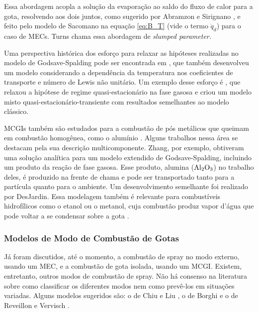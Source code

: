 Essa abordagem acopla a solução da evaporação ao saldo do fluxo de calor para a gota, resolvendo aos dois juntos, como sugerido por Abramzon e Sirignano \cite{Sirignano1989}, e feito pelo modelo de Sacomano\etal \cite{SacomanoF2022IJHMT} na equação \eqref{eq:B_T} (vide o termo $\dot q_d$) para o caso de MECs.
Turns \cite{Turns2000} chama essa abordagem de \emph{slumped parameter.}

Uma perspectiva histórica dos esforço para relaxar as hipóteses realizadas no modelo de Godsave-Spalding pode ser encontrada em \cite{FachiniF1999}, que também desenvolveu um modelo considerando a dependência da temperatura nos coeficientes de transporte e número de Lewis não unitário.
Um exemplo desse esforço é \cite{UlzamaS2007}, que relaxou a hipótese de regime quasi-estacionário na fase gasosa e criou um modelo misto quasi-estacionário-transiente com resultados semelhantes ao modelo clássico.

MCGIs também são estudados para a combustão de pós metálicos que queimam em combustão homogênea, como o alumínio \cite[p. 7]{Bergthorson2015}.
Alguns trabalhos nessa área se destacam pela sua descrição multicomponente. 
Zhang\etal \cite{Zhang2022_Coflow,Zhang2022_Counterflow}, por exemplo, obtiveram uma solução analítica para um modelo extendido de Godsave-Spalding, incluindo um produto da reação de fase gasosa.
Esse produto, alumina ($\mathrm{Al}_2 \mathrm{O}_3$) no trabalho deles, é produzido na frente de chama e pode ser transportado tanto para a partícula quanto para o ambiente.
Um desenvolvimento semelhante foi realizado por DesJardin\etal \cite{DesJardin2005}.
Essa modelagem também é relevante para combustíveis hidrofílicos como o etanol ou o metanol, cuja combustão produz vapor d'água que pode voltar a se condensar sobre a  gota \cite{SacomanoF2024CF,SacomanoF2025CF}.



\subsubsection{Modelos de Modo de Combustão de Gotas}

Já foram discutidos, até o momento, a combustão de spray no modo externo, usando um MEC, e a combustão de gota isolada, usando um MCGI.
Existem, entretanto, outros modos de combustão de spray.
Não há consenso na literatura sobre como classificar os diferentes modos nem como prevê-los em situações variadas.
Alguns modelos sugeridos são: o de Chiu e Liu \cite{ChiuH1977,ChiuH1982}, o de Borghi \cite{Borghi1996} e o de Reveillon e Vervisch \cite{ReveillonJ2005}.


